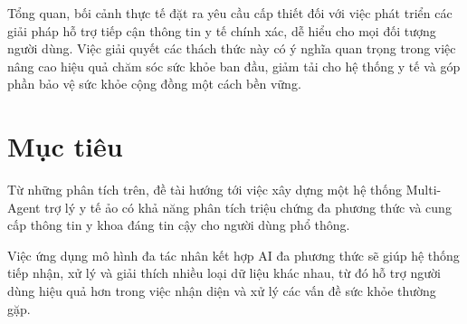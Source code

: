 Tổng quan, bối cảnh thực tế đặt ra yêu cầu cấp thiết đối với việc phát triển các giải pháp hỗ trợ tiếp cận thông tin y tế chính xác, dễ hiểu cho mọi đối tượng người dùng. Việc giải quyết các thách thức này có ý nghĩa quan trọng trong việc nâng cao hiệu quả chăm sóc sức khỏe ban đầu, giảm tải cho hệ thống y tế và góp phần bảo vệ sức khỏe cộng đồng một cách bền vững.

\section{Mục tiêu}

Từ những phân tích trên, đề tài hướng tới việc xây dựng một hệ thống Multi-Agent trợ lý y tế ảo có khả năng phân tích triệu chứng đa phương thức và cung cấp thông tin y khoa đáng tin cậy cho người dùng phổ thông.

Việc ứng dụng mô hình đa tác nhân kết hợp AI đa phương thức sẽ giúp hệ thống tiếp nhận, xử lý và giải thích nhiều loại dữ liệu khác nhau, từ đó hỗ trợ người dùng hiệu quả hơn trong việc nhận diện và xử lý các vấn đề sức khỏe thường gặp. 